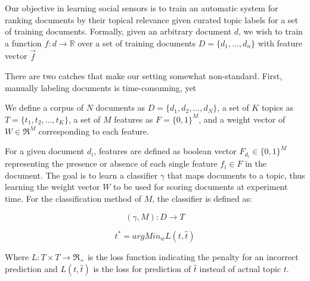 

Our objective in learning social sensors is to train an automatic
system for ranking documents by their topical relevance given curated
topic labels for a set of training documents.  Formally, given an
arbitrary document $d$, we wish to train a function $f: d \longrightarrow \mathbb{R}$ over
a set of training documents $D = \{ d_1,\ldots,d_n \}$ with feature vector $\vec{f}$

There are two catches
that make our setting somewhat non-standard.  First, manually labeling
documents is time-consuming, yet 

We define a corpus of $N$ documents as $D = \{{d_{1}}, {d_{2}}, ..., {d_{N}} \}$, a set of $K$ topics as $T = \{{t_{1}}, {t_{2}}, ..., {t_{K}} \}$, a set of $M$ features as $F = \{0,1\}^{M}$, and a weight vector of $W \in \Re^{M}$ corresponding to each feature. 

For a given document ${d_{i}}$, features are defined as boolean vector ${F_{d_{i}}} \in \{0,1\}^{M}$ representing the presence or absence of each single feature ${f_{i}} \in F$ in the document. The goal is to learn a classifier $\gamma$ that maps documents to a topic, thus learning the weight vector $W$ to be used for scoring documents at experiment time. For the classification method of $M$, the classifier is defined as:

\begin{equation}
(\gamma, M) : D \to T 
\end{equation}

\begin{equation}
t^{*} = argMin_{w} L(t,\hat{t})
\end{equation}

Where ${L : T \times T \to \Re_{+} }$ is the loss function indicating the penalty for an incorrect prediction and ${L(t,\hat{t})}$ is the loss for prediction of ${\hat{t}}$ instead of actual topic $t$.
%
%

